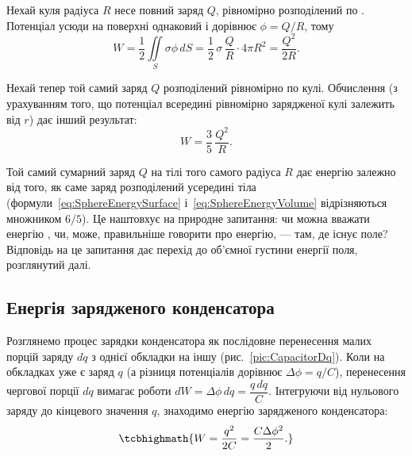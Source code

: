 
 Нехай куля радіуса $R$ несе повний заряд $Q$, рівномірно розподілений по . Потенціал усюди на поверхні однаковий і
дорівнює $\phi = Q/R$, тому
\begin{equation}\label{eq:SphereEnergySurface}
	W = \frac12 \iint\limits_S \sigma\phi\, dS = \frac12\, \sigma\, \frac{Q}{R}\cdot 4\pi R^2 = \frac{Q^2}{2R}.
\end{equation}

 Нехай тепер той самий заряд $Q$ розподілений рівномірно по  кулі. Обчислення (з урахуванням того, що потенціал
всередині рівномірно зарядженої кулі залежить від $r$) дає інший результат:
\begin{equation}\label{eq:SphereEnergyVolume}
	W = \frac35\, \frac{Q^2}{R}.
\end{equation}

\begin{Attention}
	Той самий сумарний заряд $Q$ на тілі того самого радіуса $R$ дає  енергію залежно від того, як саме заряд розподілений усередині
	тіла (формули~\eqref{eq:SphereEnergySurface} і~\eqref{eq:SphereEnergyVolume} відрізняються множником $6/5$). Це наштовхує на природне запитання:
	чи можна вважати енергію , чи, може, правильніше говорити про енергію,  --- там,
	де існує поле? Відповідь на це запитання дає перехід до об'ємної густини енергії поля, розглянутий далі.
\end{Attention}

\subsection*{Енергія зарядженого конденсатора}

Розглянемо процес зарядки конденсатора як послідовне перенесення малих порцій заряду $dq$ з однієї обкладки на іншу (рис.~\ref{pic:CapacitorDq}).
Коли на обкладках уже є заряд $q$ (а різниця потенціалів дорівнює $\Delta\phi = q/C$), перенесення чергової порції $dq$ вимагає роботи
$dW = \Delta\phi\, dq = \dfrac{q\,dq}{C}$. Інтегруючи від нульового заряду до кінцевого значення $q$, знаходимо енергію зарядженого конденсатора:
\begin{equation}\label{eq:CapacitorEnergy}
	\tcbhighmath{
		W = \frac{q^2}{2C} = \frac{C\Delta\phi^2}{2}.
	}
\end{equation}

